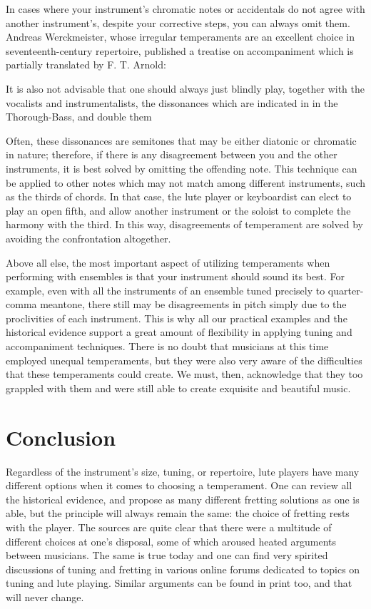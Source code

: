 In cases where your instrument's chromatic notes or accidentals do not agree with another
instrument's, despite your corrective steps, you can always omit them. Andreas
Werckmeister, whose irregular temperaments are an excellent choice in seventeenth-century repertoire,
published a treatise on accompaniment which is partially translated by F. T. Arnold:
\begin{blocks}
It is also not advisable that one should always just blindly play, together with the vocalists
and instrumentalists, the dissonances which are indicated in in the Thorough-Bass, and double
them
\autocite[210]{FTA:1}
\end{blocks}
Often, these dissonances are semitones that may be either diatonic or chromatic
in nature; therefore, if there is any disagreement between you and the other
instruments, it is best solved by omitting the offending note. This technique
can be applied to other notes which may not match among different
instruments, such as the thirds of chords.  In that case, the lute player or
keyboardist can elect to play an open fifth, and allow another instrument or the
soloist to complete the harmony with the third.  In this way, disagreements of
temperament are solved by avoiding the confrontation altogether.

Above all else, the most important aspect of utilizing temperaments when performing with ensembles
is that your instrument should sound its best. For example, even with all the instruments of an ensemble tuned
precisely to quarter-comma meantone, there still may be disagreements in pitch simply due to the
proclivities of each instrument. This is why all our practical examples and the historical evidence
support a great amount of flexibility in applying tuning and accompaniment techniques. There is no
doubt that musicians at this time employed unequal temperaments, but they were also very aware of
the difficulties that these temperaments could create.  We must, then, acknowledge that they too
grappled with them and were still able to create exquisite and beautiful music.

\section{Conclusion}

Regardless of the instrument's size, tuning, or repertoire, lute players have many different options
when it comes to choosing a temperament.  One can review all the historical evidence, and propose as
many different fretting solutions as one is able, but the principle will always remain the same: the
choice of fretting rests with the player. The sources are quite clear that there were a
multitude of different choices at one's disposal, some of which aroused heated arguments between
musicians. The same is true today and one can find very spirited discussions of tuning and
fretting in various online forums dedicated to topics on tuning and lute playing. Similar arguments
can be found in print too, and that will never change. \autocite{DD:4}

